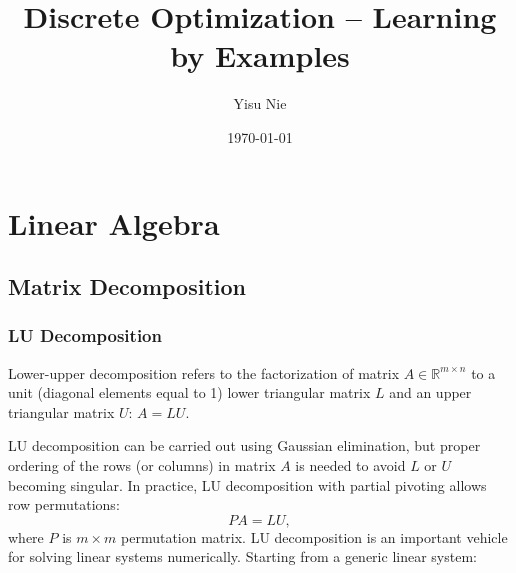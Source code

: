 \documentclass[letterpaper, 11pt]{article}
\author{Yisu Nie}
\date{\today}
\title{Discrete Optimization -- Learning by Examples}
\providecommand{\nums}[2]{\ensuremath{\mathbb{#1}^{#2}}}
\numberwithin{equation}{section}
\begin{document}
\maketitle
\section{Linear Algebra}
\label{sec:orgbeb4cc3}
\subsection{Matrix Decomposition}
\label{sec:org011d6e8}
\subsubsection{LU Decomposition}
\label{sec:org31bf2bf}
Lower-upper decomposition refers to the factorization of matrix \(A \in \nums{R}{m \times n}\) to a unit (diagonal elements equal to 1) lower triangular matrix
\(L\) and an upper triangular matrix \(U\): \(A = LU\).
\begin{margintable}
\textit{\footnotesize A 3 by 3 example}
\footnotesize{
\begin{align*}
&A = \left [ 
\begin{matrix}
   1 & 1 & 1 \\
4 & 3 & -1 \\
3 & 5 & 3
\end{matrix}
\right] \\
& L = \left [ 
\begin{matrix}
   1 & 0 & 0 \\
4 & 1 & 0 \\
3 & -2 & 1
\end{matrix}
\right],
U = \left [ 
\begin{matrix}
   1 & 1 & 1 \\
0 & -1 & -5 \\
0 & 0 & -10
\end{matrix}
\right]
\end{align*}
\end{margintable}
LU decomposition can be carried out using Gaussian elimination, but proper ordering of the rows (or columns) in matrix \(A\) is needed to avoid \(L\) or
\(U\) becoming singular. In practice, LU decomposition with partial pivoting allows row permutations:
\begin{equation}
\label{eq-la-lu-plu}
PA = LU,
\end{equation}
where \(P\) is \(m \times m\) permutation matrix. LU decomposition is an important vehicle for solving linear systems numerically. Starting from a generic linear system:
\end{document}
